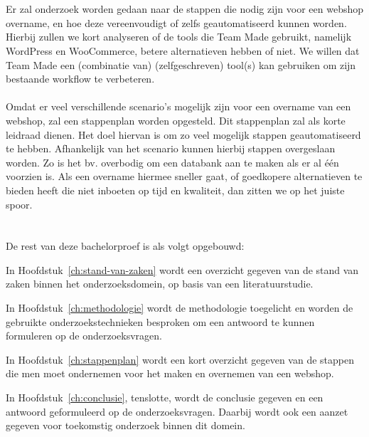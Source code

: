 \section{}%
\label{sec:onderzoeksdoelstelling}


Er zal onderzoek worden gedaan naar de stappen die nodig zijn voor een webshop overname, en hoe deze vereenvoudigt of zelfs geautomatiseerd kunnen worden. Hierbij zullen we kort analyseren of de tools die Team Made gebruikt, namelijk WordPress en WooCommerce, betere alternatieven hebben of niet. We willen dat Team Made een (combinatie van) (zelfgeschreven) tool(s) kan gebruiken om zijn bestaande workflow te verbeteren. 
\\\\
Omdat er veel verschillende scenario's mogelijk zijn voor een overname van een webshop, zal een stappenplan worden opgesteld. Dit stappenplan zal als korte leidraad dienen. Het doel hiervan is om zo veel mogelijk stappen geautomatiseerd te hebben. Afhankelijk van het scenario kunnen hierbij stappen overgeslaan worden. Zo is het bv. overbodig om een databank aan te maken als er al één voorzien is. Als een overname hiermee sneller gaat, of goedkopere alternatieven te bieden heeft die niet inboeten op tijd en kwaliteit, dan zitten we op het juiste spoor.

\section{}%
\label{sec:opzet-bachelorproef}


De rest van deze bachelorproef is als volgt opgebouwd:

In Hoofdstuk~\ref{ch:stand-van-zaken} wordt een overzicht gegeven van de stand van zaken binnen het onderzoeksdomein, op basis van een literatuurstudie.

In Hoofdstuk~\ref{ch:methodologie} wordt de methodologie toegelicht en worden de gebruikte onderzoekstechnieken besproken om een antwoord te kunnen formuleren op de onderzoeksvragen.

In Hoofdstuk~\ref{ch:stappenplan} wordt een kort overzicht gegeven van de stappen die men moet ondernemen voor het maken en overnemen van een webshop.

In Hoofdstuk~\ref{ch:conclusie}, tenslotte, wordt de conclusie gegeven en een antwoord geformuleerd op de onderzoeksvragen. Daarbij wordt ook een aanzet gegeven voor toekomstig onderzoek binnen dit domein.
